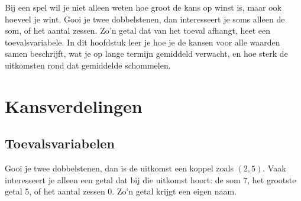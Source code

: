 %



Bij een spel wil je niet alleen weten hoe groot de kans op winst is, maar ook hoeveel je wint. Gooi je twee dobbelstenen, dan interesseert je soms alleen de som, of het aantal zessen. Zo'n getal dat van het toeval afhangt, heet een toevalsvariabele. In dit hoofdstuk leer je hoe je de kansen voor alle waarden samen beschrijft, wat je op lange termijn gemiddeld verwacht, en hoe sterk de uitkomsten rond dat gemiddelde schommelen.

\begin{oefeningen}[Start]

\end{oefeningen}


\section{Kansverdelingen}

\subsection{Toevalsvariabelen}

Gooi je twee dobbelstenen, dan is de uitkomst een koppel zoals $(2, 5)$. Vaak interesseert je alleen een getal dat bij die uitkomst hoort: de som 7, het grootste getal 5, of het aantal zessen 0. Zo'n getal krijgt een eigen naam.


